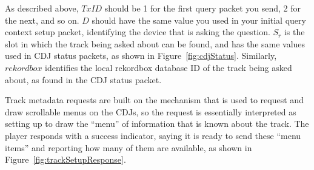 \documentclass[11pt]{article}
\begin{document}
As described above, $TxID$ should be 1 for the first query packet you
send, 2 for the next, and so on. $D$ should have the same value you
used in your initial query context setup packet, identifying the
device that is asking the question. $S_r$ is the slot in which the
track being asked about can be found, and has the same values used in
CDJ status packets, as shown in Figure~\ref{fig:cdjStatus}. Similarly,
$rekordbox$ identifies the local rekordbox database ID of the track
being asked about, as found in the CDJ status packet.

Track metadata requests are built on the mechanism that is used to
request and draw scrollable menus on the CDJs, so the request is
essentially interpreted as setting up to draw the ``menu'' of
information that is known about the track. The player responds with a
success indicator, saying it is ready to send these ``menu items'' and
reporting how many of them are available, as shown in
Figure~\ref{fig:trackSetupResponse}.
\end{document}
